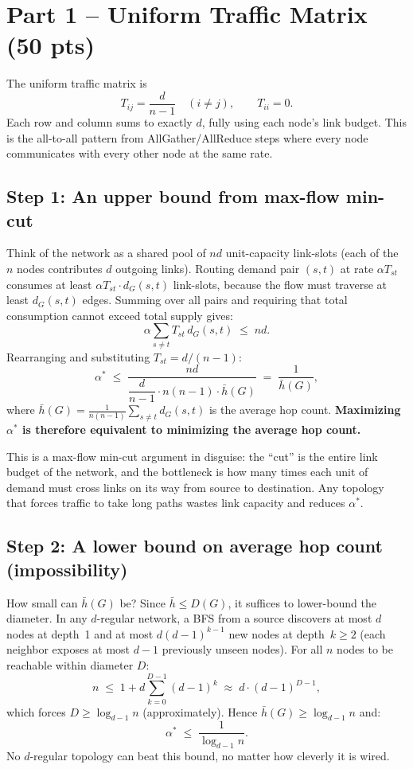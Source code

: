 \documentclass[11pt]{article}
\begin{document}
\section*{Part 1 -- Uniform Traffic Matrix (50 pts)}

The uniform traffic matrix is
\[
T_{ij} = \frac{d}{n-1} \quad (i \neq j), \qquad T_{ii} = 0.
\]
Each row and column sums to exactly $d$, fully using each node's link
budget. This is the all-to-all pattern from AllGather/AllReduce steps
where every node communicates with every other node at the same rate.

\subsection*{Step 1: An upper bound from max-flow min-cut}

Think of the network as a shared pool of $nd$ unit-capacity link-slots
(each of the $n$ nodes contributes $d$ outgoing links). Routing demand
pair $(s,t)$ at rate $\alpha T_{st}$ consumes at least
$\alpha T_{st} \cdot d_G(s,t)$ link-slots, because the flow must
traverse at least $d_G(s,t)$ edges. Summing over all pairs and requiring
that total consumption cannot exceed total supply gives:
\[
\alpha \sum_{s \neq t} T_{st}\,d_G(s,t) \;\le\; nd.
\]
Rearranging and substituting $T_{st} = d/(n-1)$:
\[
\alpha^* \;\le\;
\frac{nd}{\dfrac{d}{n-1}\cdot n(n-1)\cdot\bar{h}(G)}
\;=\; \frac{1}{\bar{h}(G)},
\]
where $\bar{h}(G) = \frac{1}{n(n-1)}\sum_{s\neq t} d_G(s,t)$ is the
average hop count. \textbf{Maximizing $\alpha^*$ is therefore equivalent
to minimizing the average hop count.}

This is a max-flow min-cut argument in disguise: the ``cut'' is the
entire link budget of the network, and the bottleneck is how many times
each unit of demand must cross links on its way from source to
destination. Any topology that forces traffic to take long paths wastes
link capacity and reduces $\alpha^*$.

\subsection*{Step 2: A lower bound on average hop count (impossibility)}

How small can $\bar{h}(G)$ be? Since $\bar{h} \le D(G)$, it suffices to
lower-bound the diameter. In any $d$-regular network, a BFS from a
source discovers at most $d$ nodes at depth~1 and at most $d(d-1)^{k-1}$
new nodes at depth~$k \ge 2$ (each neighbor exposes at most $d-1$
previously unseen nodes). For all $n$ nodes to be reachable within
diameter $D$:
\[
n \;\le\; 1 + d\sum_{k=0}^{D-1}(d-1)^k \;\approx\; d \cdot (d-1)^{D-1},
\]
which forces $D \ge \log_{d-1} n$ (approximately). Hence
$\bar{h}(G) \ge \log_{d-1} n$ and:
\begin{equation}
\alpha^* \;\le\; \frac{1}{\log_{d-1} n}.
\label{eq:upper}
\end{equation}
No $d$-regular topology can beat this bound, no matter how cleverly
it is wired.
\end{document}
